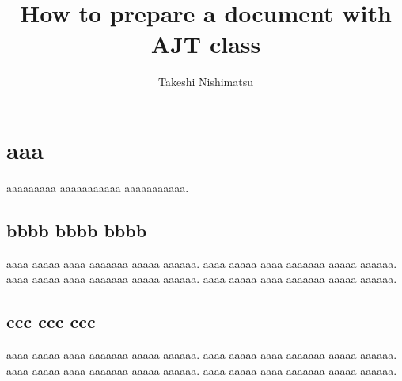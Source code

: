 \documentclass{ajt}            %
\title{How to prepare a document with AJT class}
\author{Takeshi Nishimatsu}
\begin{document}
\maketitle

\section{aaa}
aaaaaaaaa aaaaaaaaaaa aaaaaaaaaaa\cite{ruby-mathml}.

\subsection{bbbb bbbb bbbb}
aaaa aaaaa aaaa aaaaaaa aaaaa aaaaaa\cite{ulmul-rubyforge-org}.
aaaa aaaaa aaaa aaaaaaa aaaaa aaaaaa.
aaaa aaaaa aaaa aaaaaaa aaaaa aaaaaa.
aaaa aaaaa aaaa aaaaaaa aaaaa aaaaaa.

\subsection{ccc ccc ccc}
aaaa aaaaa aaaa aaaaaaa aaaaa aaaaaa\cite{Slidy}.
aaaa aaaaa aaaa aaaaaaa aaaaa aaaaaa\cite{ulmul-rubygems}.
aaaa aaaaa aaaa aaaaaaa aaaaa aaaaaa.
aaaa aaaaa aaaa aaaaaaa aaaaa aaaaaa.


\end{document}
